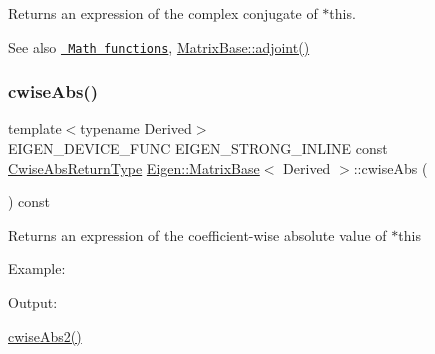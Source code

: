 \begin{DoxyReturn}{Returns}
an expression of the complex conjugate of {\ttfamily $\ast$this}.
\end{DoxyReturn}
\begin{DoxySeeAlso}{See also}
\href{group__CoeffwiseMathFunctions.html\#cwisetable_conj}{\texttt{ Math functions}}, \mbox{\hyperlink{class_eigen_1_1_matrix_base_afacca1f88da57e5cd87dd07c8ff926bb}{Matrix\+Base\+::adjoint()}} 
\end{DoxySeeAlso}
\mbox{\label{class_eigen_1_1_matrix_base_a8f2dbd5d9573c79c5dd356ddb29a0ee9}} 
\subsubsection{\texorpdfstring{cwiseAbs()}{cwiseAbs()}}
{\footnotesize\ttfamily template$<$typename Derived$>$ \\
E\+I\+G\+E\+N\+\_\+\+D\+E\+V\+I\+C\+E\+\_\+\+F\+U\+NC E\+I\+G\+E\+N\+\_\+\+S\+T\+R\+O\+N\+G\+\_\+\+I\+N\+L\+I\+NE const \mbox{\hyperlink{class_eigen_1_1_cwise_unary_op}{Cwise\+Abs\+Return\+Type}} \mbox{\hyperlink{class_eigen_1_1_matrix_base}{Eigen\+::\+Matrix\+Base}}$<$ Derived $>$\+::cwise\+Abs (\begin{DoxyParamCaption}{ }\end{DoxyParamCaption}) const\hspace{0.3cm}{\ttfamily [inline]}}

\begin{DoxyReturn}{Returns}
an expression of the coefficient-\/wise absolute value of {\ttfamily $\ast$this} 
\end{DoxyReturn}
Example\+: 
\begin{DoxyCodeInclude}{0}
\end{DoxyCodeInclude}
 Output\+: 
\begin{DoxyVerbInclude}
\end{DoxyVerbInclude}
 \mbox{\hyperlink{class_eigen_1_1_matrix_base_a60808fcf09547e14952957bbdf75d3c6}{cwise\+Abs2()}} \mbox{\label{class_eigen_1_1_matrix_base_a60808fcf09547e14952957bbdf75d3c6}} 
